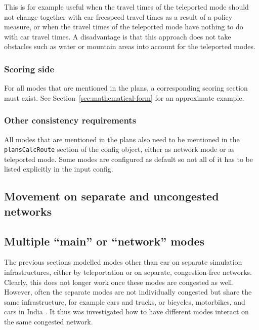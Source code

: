This is for example useful when the travel times of the teleported mode should not change together with car freespeed travel times as a result of a policy measure, or when the travel times of the teleported mode have nothing to do with car travel times.  A disadvantage is that this approach does not take obstacles such as water or mountain areas into account for the teleported modes.


\subsubsection{Scoring side}

For all modes that are mentioned in the plans, a corresponding scoring section must exist.  See Section~\ref{sec:mathematical-form} for an approximate example.

\subsubsection{Other consistency requirements}

All modes that are mentioned in the plans also need to be mentioned in the \lstinline{plansCalcRoute} section of the config object, either as network mode or as teleported mode.  Some modes are configured as default so not all of it has to be listed explicitly in the input config.


\subsection{Movement on separate and uncongested networks}

\subsection{Multiple ``main'' or ``network'' modes}

The previous sections modelled modes other than car on separate simulation infrastructures, either by teleportation or on separate, congestion-free networks.  Clearly, this does not longer work once these modes are congested as well.  However, often the separate modes are not individually congested but share the same infrastructure, for example cars and trucks, or bicycles, motorbikes, and cars in India \citep{AgarwalEtcMixedTraffic}.  It thus was investigated how to have different modes interact on the same congested network.

